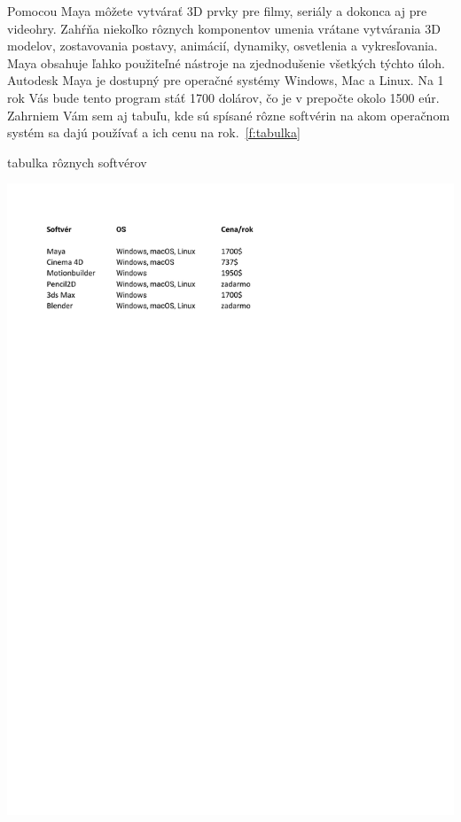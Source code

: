 \documentclass[10pt,oneside,slovak,a4paper]{article}
\begin{document}
Pomocou Maya môžete vytvárať 3D prvky pre filmy, seriály a dokonca aj pre videohry. Zahŕňa niekoľko rôznych komponentov umenia vrátane vytvárania 3D modelov, zostavovania postavy, animácií, dynamiky, osvetlenia a vykresľovania. Maya obsahuje ľahko použiteľné nástroje na zjednodušenie všetkých týchto úloh.\\

Autodesk Maya je dostupný pre operačné systémy Windows, Mac a Linux. Na 1 rok Vás bude tento program stáť 1700 dolárov, čo je v prepočte okolo 1500 eúr. Zahrniem Vám sem aj tabuľu, kde sú spísané rôzne softvérin na akom operačnom systém sa dajú používať a ich cenu na rok.~\ref{f:tabulka}

\begin{table}[tbh]
\centering
\caption{tabulka rôznych softvérov}
\label{f:tabulka}
\includegraphics[width=7in]{tabulka.pdf}
\end{table}
\end{document}
